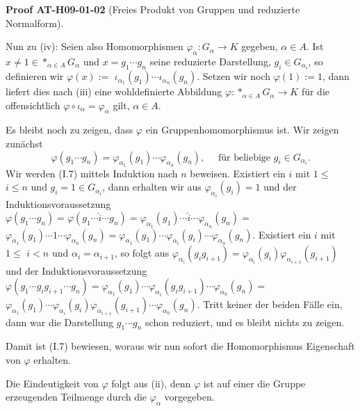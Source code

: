 \documentclass[10pt, letterpaper]{article}
\newcommand{\CustomHeading}[3]{%
  \par\medskip\noindent%
  \textbf{#1 #2} \textnormal{(#3)}.\enskip%
}
\newenvironment{PROOF}[2]{\begin{unitbox}\CustomHeading{Proof}{#1}{#2}}{\end{unitbox}}
\begin{document}
\begin{PROOF}{AT-H09-01-02}{Freies Produkt von Gruppen und reduzierte Normalform}
Nun zu (iv): Seien also Homomorphismen $\varphi_\alpha: G_\alpha \rightarrow K$ gegeben, $\alpha \in A$. Ist $x \neq 1 \in *_{\alpha \in A} G_\alpha$ und $x=g_1 \cdots g_n$ seine reduzierte Darstellung, $g_i \in G_{\alpha_i}$, so definieren wir $\varphi(x):=$ $\iota_{\alpha_1}\left(g_1\right) \cdots \iota_{\alpha_n}\left(g_n\right)$. Setzen wir noch $\varphi(1):=1$, dann liefert dies nach (iii) eine wohldefinierte Abbildung $\varphi: *_{\alpha \in A} G_\alpha \rightarrow K$ für die offensichtlich $\varphi \circ \iota_\alpha=\varphi_\alpha$ gilt, $\alpha \in A$. 

Es bleibt noch zu zeigen, dass $\varphi$ ein Gruppenhomomorphismus ist. Wir zeigen zunächst
$$
\varphi\left(g_1 \cdots g_n\right)=\varphi_{\alpha_1}\left(g_1\right) \cdots \varphi_{\alpha_n}\left(g_n\right), \quad \text { für beliebige } g_i \in G_{\alpha_i} .
$$
Wir werden (I.7) mittels Induktion nach $n$ beweisen. Existiert ein $i$ mit $1 \leq$ $i \leq n$ und $g_i=1 \in G_{\alpha_i}$, dann erhalten wir aus $\varphi_{\alpha_i}\left(g_i\right)=1$ und der Induktionsvoraussetzung $\varphi\left(g_1 \cdots g_n\right)=\varphi\left(g_1 \cdots \hat{i} \cdots g_n\right)=\varphi_{\alpha_1}\left(g_1\right) \cdots \hat{i} \cdots \varphi_{\alpha_n}\left(g_n\right)=$ $\varphi_{\alpha_1}\left(g_1\right) \cdots 1 \cdots \varphi_{\alpha_n}\left(g_n\right)=\varphi_{\alpha_1}\left(g_1\right) \cdots \varphi_{\alpha_i}\left(g_i\right) \cdots \varphi_{\alpha_n}\left(g_n\right)$. Existiert ein $i$ mit $1 \leq$ $i<n$ und $\alpha_i=\alpha_{i+1}$, so folgt aus $\varphi_{\alpha_i}\left(g_i g_{i+1}\right)=\varphi_{\alpha_i}\left(g_i\right) \varphi_{\alpha_{i+1}}\left(g_{i+1}\right)$ und der Induktionsvoraussetzung $\varphi\left(g_1 \cdots g_i g_{i+1} \cdots g_n\right)=\varphi_{\alpha_1}\left(g_1\right) \cdots \varphi_{\alpha_i}\left(g_i g_{i+1}\right) \cdots \varphi_{\alpha_n}\left(g_n\right)=$ $\varphi_{\alpha_1}\left(g_1\right) \cdots \varphi_{\alpha_i}\left(g_i\right) \varphi_{\alpha_{i+1}}\left(g_{i+1}\right) \cdots \varphi_{\alpha_n}\left(g_n\right)$. Tritt keiner der beiden Fälle ein, dann war die Darstellung $g_1 \cdots g_n$ schon reduziert, und es bleibt nichts zu zeigen. 

Damit ist (I.7) bewiesen, woraus wir nun sofort die Homomorphismus Eigenschaft von $\varphi$ erhalten. 

Die Eindeutigkeit von $\varphi$ folgt aus (ii), denn $\varphi$ ist auf einer die Gruppe erzeugenden Teilmenge durch die $\varphi_\alpha$ vorgegeben.
\end{PROOF}
\end{document}

